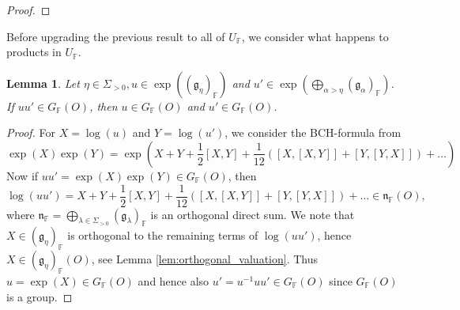 \documentclass[12pt]{amsart}
\newcommand{\F}{\mathbb{F} }
\newcommand{\Q}{\mathbb{Q} }
\newcommand{\frakg}{\mathfrak{g}}
\newcommand{\frakn}{\mathfrak{n}}
\newcommand{\A}{\mathbb{A}}
\numberwithin{equation}{section}
\newtheorem{lemma}[theorem]{Lemma}
\theoremstyle{remark} %
\begin{document}
\begin{proof}
\end{proof}
Before upgrading the previous result to all of $U_\F$, we consider what happens to products in $U_\F$.

\begin{lemma} \label{lem:nn'}
	Let $\eta \in \Sigma_{> 0}, u\in \exp((\frakg_\eta)_\F)$ and $u' \in \exp(\bigoplus_{\alpha > \eta}(\frakg_\alpha)_\F)$. If $uu' \in G_\F(O)$, then $u\in G_\F(O)$ and $u' \in G_\F(O)$.
\end{lemma}
\begin{proof}
	For $X= \log(u)$ and $Y= \log(u')$, we consider the BCH-formula from \cite[Proposition \ref{I-prop:BCH}]{AppAGRCF}
	$$
	\exp(X)\exp(Y)= \exp\left(X+Y+\frac{1}{2}[X,Y] + \frac{1}{12}\left(\left[X,\left[X,Y\right]\right]+\left[Y,\left[Y,X\right]\right]\right) + \ldots \right)
	$$
	Now if $uu' = \exp(X)\exp(Y) \in G_\F(O)$, then
	$$
	\log(uu') = X+Y+\frac{1}{2}[X,Y] + \frac{1}{12}([X,[X,Y]]+[Y,[Y,X]]) + \ldots \in \frakn_\F(O),
	$$
	where $\frakn_\F = \bigoplus_{\lambda \in \Sigma_{ > 0}} (\frakg_\lambda)_\F$ is an orthogonal direct sum. We note that $X\in (\frakg_{\eta})_\F$ is orthogonal to the remaining terms of $\log(uu')$, hence $X \in (\frakg_\eta)_\F(O)$, see Lemma \ref{lem:orthogonal_valuation}. Thus $u= \exp(X) \in G_\F(O)$ and hence also $u' = u^{-1}uu' \in G_\F(O)$ since $G_\F(O)$ is a group.
\end{proof}
\end{document}
